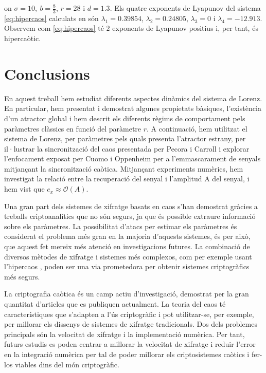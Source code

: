 \documentclass[11pt,a4paper,openright,oneside]{article}
\numberwithin{equation}{section}
\theoremstyle{definition}
\begin{document}
on $\sigma = 10, \ b = \frac{8}{3}$, $r=28$ i $d=1.3$. Els quatre exponents de Lyapunov del sistema \eqref{eq:hipercaos} calculats en \cite{lor_hipercaotic} són $\lambda_1 = 0.39854$, $\lambda_2 = 0.24805$, $\lambda_3 = 0$ i $\lambda_4 = -12.913$. Observem com \eqref{eq:hipercaos} té $2$ exponents de Lyapunov positius i, per tant, és hipercaòtic.

\normalfont

\newpage

\section{Conclusions}

En aquest treball hem estudiat diferents aspectes dinàmics del sistema de Lorenz. En particular, hem presentat i demostrat algunes propietats bàsiques, l'existència d'un atractor global i hem descrit els diferents règims de comportament pels paràmetres clàssics en funció del paràmetre $r$. A continuació, hem utilitzat el sistema de Lorenz, per paràmetres pels quals presenta l'atractor estrany, per il·lustrar la sincronització del caos presentada per Pecora i Carroll \cite{Pecora_1} i explorar l'enfocament exposat per Cuomo i Oppenheim \cite{Cuomo} per a l'emmascarament de senyals mitjançant la sincronització caòtica. Mitjançant experiments numèrics, hem investigat la relació entre la recuperació del senyal i l'amplitud A del senyal, i hem vist que $e_x\approx \mathcal{O}(A)$.

Una gran part dels sistemes de xifratge basats en caos s'han demostrat gràcies a treballs criptoanalítics que no són segurs, ja que és possible extraure informació sobre els paràmetres. La possibilitat d'atacs per estimar els paràmetres és considerat el problema més gran en la majoria d'aquests sistemes, és per això, que aquest fet mereix més atenció en investigacions futures. La combinació de diversos mètodes de xifratge i sistemes més complexos, com per exemple usant l'hipercaos \cite{Hipercaos}, poden ser una via prometedora per obtenir sistemes criptogràfics més segurs.

La criptografia caòtica és un camp actiu d'investigació, demostrat per la gran quantitat d'articles que es publiquen actualment. La teoria del caos té característiques que s'adapten a l'ús criptogràfic i pot utilitzar-se, per exemple, per millorar els dissenys de sistemes de xifratge tradicionals. Dos dels problemes principals són la velocitat de xifratge i la implementació numèrica. Per tant, futurs estudis es poden centrar a millorar la velocitat de xifratge i reduir l'error en la integració numèrica per tal de poder millorar els criptosistemes caòtics i fer-los viables dins del món criptogràfic.
\end{document}
